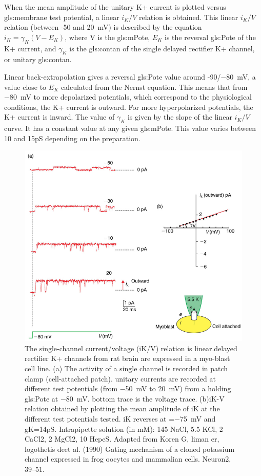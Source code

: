 \documentclass[class={myRUCProject}, crop=false]{standalone}
\begin{document}
When the mean amplitude of the unitary K+ current is plotted versus \gls{gls:membrane} test potential, a linear \(i_K/V\) relation is obtained.  This linear \(i_K/V\) relation (between -50 and \qty{20}{\mV}) is described by the equation \(i_K = \gamma_K(V-E_K)\), where V is the \gls{gls:mPote}, \(E_K\) is the reversal \gls{gls:Pote} of the K+ current, and \(\gamma_K\) is the \gls{gls:contan} of the single delayed rectifier K+ channel, or unitary \gls{gls:contan}. 

Linear back-extrapolation gives a reversal \gls{gls:Pote} value around -90/\qty{-80}{\mV}, a value close to \(E_K\) calculated from the Nernst equation. This means that from \qty{-80}{\mV} to more depolarized potentials, which correspond to the physiological conditions, the K+ current is outward. For more hyperpolarized potentials, the K+ current is inward. The value of \(\gamma_K\) is given by the slope of the linear \(i_K/V\)curve. It has a constant value at any given \gls{gls:mPote}. This value varies between 10 and 15pS depending on the preparation. 

\begin{figure}[H]
     \centering
     \includegraphics[width=0.5\linewidth]{Pictures//Anakin/I-V.K.png}
     \caption{The single-channel current/voltage (iK/V) relation is linear.delayed rectifier K+ channels from rat brain are expressed in a myo-blast cell line. (a) The activity of a single channel is recorded in patch clamp (cell-attached patch). unitary currents are recorded at different test potentials (from \qty{-50}{\mV} to \qty{20}{\mV}) from a holding \gls{gls:Pote} at \qty{-80}{\mV}. bottom trace is the voltage trace. (b)iK-V relation obtained by plotting the mean amplitude of iK at the different test potentials tested. iK reverses at =\qty{-75}{\mV} and gK=14pS. Intrapipette solution (in mM): 145 NaCl, 5.5 KCl, 2 CaCl2, 2 MgCl2, 10 HepeS. Adapted from Koren G, liman er, logothetis deet al. (1990) Gating mechanism of a cloned potassium channel expressed in frog oocytes and mammalian cells. Neuron2, 39–51.}
     \label{fig:enter-label}
 \end{figure} 
\end{document}
